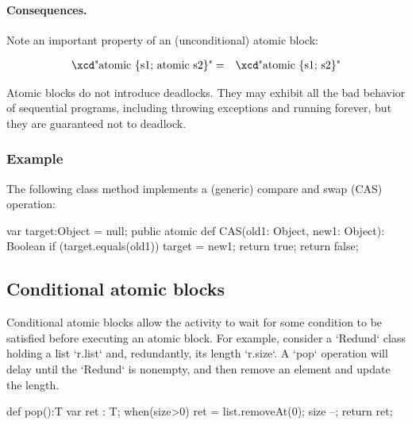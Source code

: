 \paragraph{Consequences.}
Note an important property of an (unconditional) atomic block:

\begin{eqnarray}
 \mbox{\xcd"atomic \{s1; atomic s2\}"} &=& \mbox{\xcd"atomic \{s1; s2\}"}
\end{eqnarray}

Atomic blocks do not introduce deadlocks.    They may exhibit all the bad
behavior of sequential programs, including throwing exceptions and running
forever, but they are guaranteed not to deadlock.


\subsubsection{Example}

The following class method implements a (generic) compare and swap (CAS) operation:


\begin{xten}
var target:Object = null;
public atomic def CAS(old1: Object, new1: Object): Boolean {
   if (target.equals(old1)) {
     target = new1;
     return true;
   }
   return false;
}
\end{xten}

\subsection{Conditional atomic blocks}



Conditional atomic blocks allow the activity to wait for some condition to be
satisfied before executing an atomic block. For example, consider a
\xcd`Redund` class holding a list \xcd`r.list` and, redundantly, its length
\xcd`r.size`.  A \xcd`pop` operation will delay until the \xcd`Redund` is
nonempty, and then remove an element and update the length.  
\begin{xten}
def pop():T {
  var ret : T;
  when(size>0) {
    ret = list.removeAt(0);
    size --;
    }
  return ret;
}
\end{xten}


